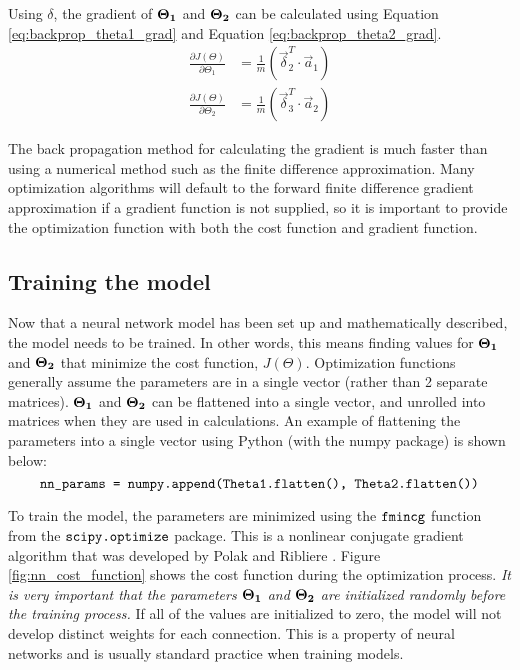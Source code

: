 Using $\delta$, the gradient of $\mathbf{\Theta_1}$ and $\mathbf{\Theta_2}$ can be calculated using Equation \ref{eq:backprop_theta1_grad} and Equation \ref{eq:backprop_theta2_grad}.
\begin{align}
	\frac{\partial J(\Theta)}{\partial \Theta_1} &= \frac{1}{m} \left(\vec{\delta}_2^T \cdot \vec{a}_1 \right) \label{eq:backprop_theta1_grad} \\
	\frac{\partial J(\Theta)}{\partial \Theta_2} &= \frac{1}{m} \left(\vec{\delta}_3^T \cdot \vec{a}_2 \right) \label{eq:backprop_theta2_grad}
\end{align}

The back propagation method for calculating the gradient is much faster than using a numerical method such as the finite difference approximation.  Many optimization algorithms will default to the forward finite difference gradient approximation if a gradient function is not supplied, so it is important to provide the optimization function with both the cost function and gradient function.

\subsection{Training the model}
Now that a neural network model has been set up and mathematically described, the model needs to be trained.  In other words, this means finding values for $\mathbf{\Theta_1}$ and $\mathbf{\Theta_2}$ that minimize the cost function, $J(\Theta)$.  Optimization functions generally assume the parameters are in a single vector (rather than 2 separate matrices).  $\mathbf{\Theta_1}$ and $\mathbf{\Theta_2}$ can be flattened into a single vector, and unrolled into matrices when they are used in calculations.  An example of flattening the parameters into a single vector using Python (with the numpy package) is shown below:
\begin{equation} \nonumber
	\texttt{nn\_params = numpy.append(Theta1.flatten(), Theta2.flatten())}
\end{equation}

To train the model, the parameters are minimized using the $\texttt{fmincg}$ function from the $\texttt{scipy.optimize}$ package.  This is a nonlinear conjugate gradient algorithm that was developed by Polak and Ribliere \cite{numerical_fmin_cg}.  Figure \ref{fig:nn_cost_function} shows the cost function during the optimization process.  \textit{It is very important that the parameters $\mathbf{\Theta_1}$ and $\mathbf{\Theta_2}$ are initialized randomly before the training process.}  If all of the values are initialized to zero, the model will not develop distinct weights for each connection.  This is a property of neural networks and is usually standard practice when training models.

